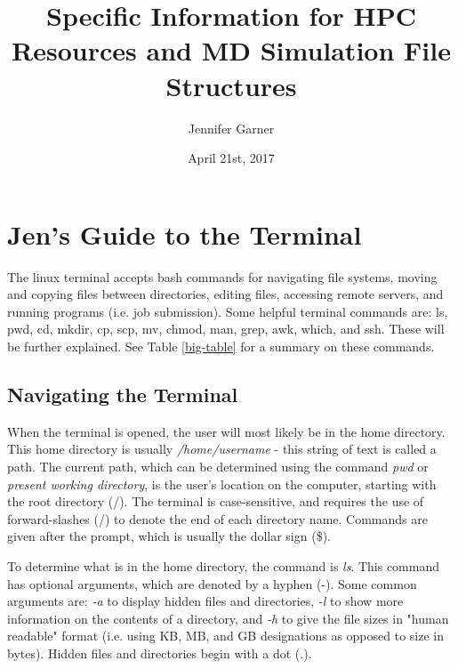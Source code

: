 \documentclass[12pt]{article}
\title{Specific Information for HPC Resources and MD Simulation File Structures}
\author{Jennifer Garner}
\date{April 21st, 2017}
\begin{document}
\maketitle
\newpage
\tableofcontents
\newpage

\section{Jen's Guide to the Terminal}

\quad\enskip\quad The linux terminal accepts bash commands for navigating file systems, moving and copying files between directories, editing files, accessing remote servers, and running programs (i.e. job submission). Some helpful terminal commands are: ls, pwd, cd, mkdir, cp, scp, mv, chmod, man, grep, awk, which, and ssh. These will be further explained. See Table \ref{big-table} for a summary on these commands.

\subsection{Navigating the Terminal}

\quad\enskip\quad When the terminal is opened, the user will most likely be in the home directory. This home directory is usually \textit{/home/username} - this string of text is called a path. The current path, which can be determined using the command \textit{pwd} or \textit{present working directory}, is the user's location on the computer, starting with the root directory (/). The terminal is case-sensitive, and requires the use of forward-slashes (/) to denote the end of each directory name. Commands are given after the prompt, which is usually the dollar sign (\$). 

\quad To determine what is in the home directory, the command is \textit{ls}. This command has optional arguments, which are denoted by a hyphen (-). Some common arguments are: \textit{-a} to display hidden files and directories, \textit{-l} to show more information on the contents of a directory, and \textit{-h} to give the file sizes in "human readable" format (i.e. using KB, MB, and GB designations as opposed to size in bytes). Hidden files and directories begin with a dot (.).
\end{document}
